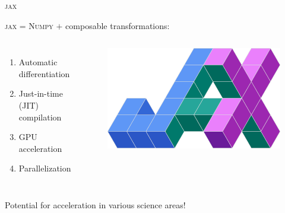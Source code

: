 \documentclass[usenames,dvipsnames,t]{beamer}
\begin{document}
\begin{frame}{\textsc{jax}}

  \def\x{4mm}
  \def\y{2mm}
  \def\z{1cm}
  
  
  
  \textsc{jax} = \textsc{Numpy} $+$ composable transformations: 
  \begin{columns}
    \begin{enumerate}
      \item Automatic differentiation
      
      \vspace{\x}
      
      \item Just-in-time (JIT) compilation
      
      \vspace{\x}
      
      \item GPU acceleration
      
      \vspace{\x}
      
      \item Parallelization
  \end{enumerate}
  \begin{figure}
    \includegraphics[width=\textwidth]{Figures/jax.png}
  \end{figure}
\end{columns}

\vspace{\z}

Potential for acceleration in various science areas!




\end{frame}  
\end{document}

